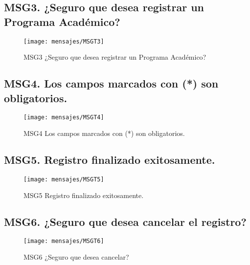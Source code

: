 \subsection{MSG3. ¿Seguro que desea registrar un Programa Académico?}
    \begin{figure}[htbp]
        \begin{center}
            \texttt{[image: mensajes/MSGT3]}
            \caption{MSG3 ¿Seguro que desea registrar un Programa Académico?}
            \label{fig:MSG3}
        \end{center}
    \end{figure}

\subsection{MSG4. Los campos marcados con (*) son obligatorios.}
    \begin{figure}[htbp]
        \begin{center}
            \texttt{[image: mensajes/MSGT4]}
            \caption{MSG4 Los campos marcados con (*) son obligatorios.}
            \label{fig:MSG4}
        \end{center}
    \end{figure}

\subsection{MSG5. Registro finalizado exitosamente.}
    \begin{figure}[htbp]
        \begin{center}
            \texttt{[image: mensajes/MSGT5]}
            \caption{MSG5 Registro finalizado exitosamente.}
            \label{fig:MSG5}
        \end{center}
    \end{figure}

\subsection{MSG6. ¿Seguro que desea cancelar el registro?}
    \begin{figure}[htbp]
        \begin{center}
            \texttt{[image: mensajes/MSGT6]}
            \caption{MSG6 ¿Seguro que desea cancelar?}
            \label{fig:MSG6}
        \end{center}
    \end{figure}

